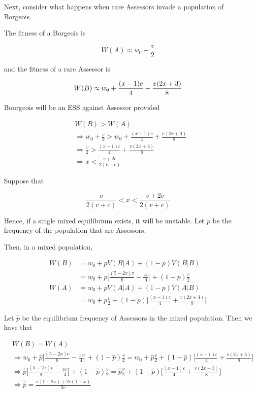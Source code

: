 \documentclass{article}
\begin{document}
Next, consider what happens when rare Assessors invade a population of Borgeois.

The fitness of a Borgeois is

\begin{equation*}
    W(A) \approx w_0 + \frac{v}{2}
\end{equation*}

and the fitness of a rare Assessor is

\begin{equation*}
    W(B) \approx w_0 + \frac{(x - 1) c}{4} + \frac{v (2 x + 3)}{8} \\
\end{equation*}

Bourgeois will be an ESS against Assessor provided

\begin{align*}
    &W(B) > W(A) \\
    &\Rightarrow w_0 + \frac{v}{2} > w_0 + \frac{(x - 1) c}{4} + \frac{v (2 x + 3)}{8} \\
    &\Rightarrow \frac{v}{2} > \frac{(x - 1) c}{4} + \frac{v (2 x + 3)}{8} \\
    &\Rightarrow x < \frac{v + 2 c}{2(v + c)}
\end{align*}

Suppose that

\begin{equation*}
    \frac{v}{2(v + c)} < x < \frac{v + 2 c}{2(v + c)}
\end{equation*}

Hence, if a single mixed equilibrium exists, it will be unstable. Let
$p$ be the frequency of the population that are Assessors.

Then, in a mixed population,

\begin{align*}
    W(B) &= w_0 + p V(B|A) + (1 - p) V(B|B) \\
         &= w_0 + p \Big[\frac{(5 - 2 x) v}{8} - \frac{x c}{4}\Big]
            + (1 - p) \frac{v}{2} \\
    W(A) &= w_0 + p V(A|A) + (1 - p) V(A|B) \\
         &= w_0 + p \frac{v}{2}
            + (1 - p) \Big[\frac{(x - 1) c}{4} + \frac{v (2 x + 3)}{8}\Big]
\end{align*}

Let $\hat{p}$ be the equilibrium frequency of Assessors in the mixed
population. Then we have that

\begin{align*}
    &W(B) = W(A) \\
    &\Rightarrow
        w_0 + \hat{p} \Big[\frac{(5 - 2 x) v}{8} - \frac{x c}{4}\Big]
        + (1 - \hat{p}) \frac{v}{2}
        =
        w_0 + \hat{p} \frac{v}{2}
        + (1 - \hat{p}) \Big[\frac{(x - 1) c}{4} + \frac{v (2 x + 3)}{8}\Big] \\
    &\Rightarrow
        \hat{p} \Big[\frac{(5 - 2 x) v}{8} - \frac{x c}{4}\Big]
        + (1 - \hat{p}) \frac{v}{2}
        =
        \hat{p} \frac{v}{2}
        + (1 - \hat{p}) \Big[\frac{(x - 1) c}{4} + \frac{v (2 x + 3)}{8}\Big] \\
    &\Rightarrow \hat{p} = \frac{v (1 - 2 x) + 2 c (1 - x)}{2 c}
\end{align*}
\end{document}

